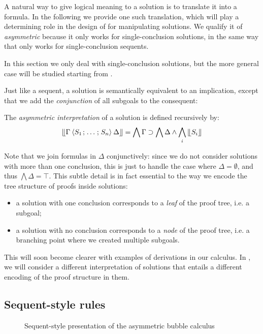 A natural way to give logical meaning to a solution is to translate it into a
formula. In the following we provide one such translation, which will play a
determining role in the design of  for manipulating solutions. We
qualify it of \emph{asymmetric} because it only works for single-conclusion
solutions, in the same way that  only works for single-conclusion
sequents.

\begin{remark}
In this section we only deal with single-conclusion solutions, but the more
general case will be studied starting from .
\end{remark}

Just like a sequent, a solution is semantically equivalent to an implication,
except that we add the \emph{conjunction} of all subgoals to the consequent:

\begin{definition}
The \emph{asymmetric interpretation} of a solution is defined recursively by:
$$\llfloor \Gamma \mathbin{\langle S_1 \;\!;\!\; \ldots \;\!;\!\; S_n \rangle} \Delta \rrfloor = \bigwedge \Gamma
  \supset \bigwedge \Delta \land \bigwedge_i{\llfloor S_i \rrfloor}$$
\end{definition}

Note that we join formulas in $\Delta$ conjunctively: since we do not consider
solutions with more than one conclusion, this is just to handle the case where
$\Delta = \emptyset$, and thus $\bigwedge \Delta = \top$. This subtle detail is
in fact essential to the way we encode the tree structure of proofs inside
solutions:
\begin{itemize}
\item a solution with one conclusion corresponds to a \emph{leaf} of the proof
tree, i.e. a subgoal;
\item a solution with no conclusion corresponds to a \emph{node} of the proof
tree, i.e. a branching point where we created multiple subgoals.
\end{itemize}
This will soon become clearer with examples of derivations in our calculus. In
, we will consider a different interpretation of solutions that
entails a different encoding of the proof structure in them.

\subsection{Sequent-style rules}

\begin{figure*}

\caption{Sequent-style presentation of the asymmetric bubble calculus }
\end{figure*}

